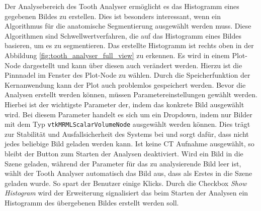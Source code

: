 Der Analysebereich des Tooth Analyser ermöglicht es das Histogramm eines
gegebenen Bildes zu erstellen. Dies ist besonders interessant, wenn ein
Algorithmus für die anatomische Segmentierung ausgewählt werden muss. Diese Algorithmen
sind Schwellwertverfahren, die auf das Histogramm eines Bildes basieren, um es zu
segmentieren. Das erstellte Histogramm ist rechts oben in der Abbildung
\ref{fig:tooth_analyser_full_view} zu erkennen. Es wird in einem Plot-Node dargestellt
und kann über diesen auch verändert werden. Hierzu ist die Pinnnadel im Fenster
des Plot-Node zu wählen. Durch die Speicherfunktion der Kernanwendung kann der Plot
auch problemlos gespeichert werden. Bevor die Analysen erstellt werden können, müssen
Parametereinstellungen gewählt werden. Hierbei ist der wichtigste Parameter der,
indem das konkrete Bild ausgewählt wird. Bei diesem Parameter handelt es sich um
ein Dropdown, indem nur Bilder mit dem Typ \texttt{vtkMRMLScalarVolumeNode}
ausgewählt werden können. Dies trägt zur Stabilität und Ausfallsicherheit des Systems
bei und sorgt dafür, dass nicht jedes beliebige Bild geladen werden kann. Ist keine
\ac{CT} Aufnahme ausgewählt, so bleibt der Button zum Starten der Analysen deaktiviert.
Wird ein Bild in die Szene geladen, während der Parameter für das zu analysierende
Bild leer ist, wählt der Tooth Analyser automatisch das Bild aus, dass als Erstes
in die Szene geladen wurde. So spart der Benutzer einige Klicks. Durch die Checkbox
\textit{Show Histogram} wird der Erweiterung signalisiert das beim Starten der
Analysen ein Histogramm des übergebenen Bildes erstellt werden soll.

